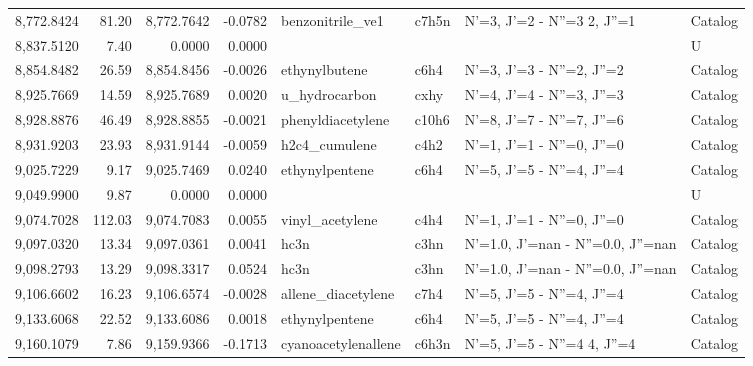 \begin{longtable}{rrrrllll}
 8,772.8424 &     81.20 &        8,772.7642 &   -0.0782 &            benzonitrile_ve1 &   c7h5n &      N'=3, J'=2 - N''=3     2, J''=1 &    Catalog \\
 8,837.5120 &      7.40 &            0.0000 &    0.0000 &                             &         &                                      &          U \\
 8,854.8482 &     26.59 &        8,854.8456 &   -0.0026 &               ethynylbutene &    c6h4 &            N'=3, J'=3 - N''=2, J''=2 &    Catalog \\
 8,925.7669 &     14.59 &        8,925.7689 &    0.0020 &               u_hydrocarbon &    cxhy &            N'=4, J'=4 - N''=3, J''=3 &    Catalog \\
 8,928.8876 &     46.49 &        8,928.8855 &   -0.0021 &           phenyldiacetylene &   c10h6 &            N'=8, J'=7 - N''=7, J''=6 &    Catalog \\
 8,931.9203 &     23.93 &        8,931.9144 &   -0.0059 &               h2c4_cumulene &    c4h2 &            N'=1, J'=1 - N''=0, J''=0 &    Catalog \\
 9,025.7229 &      9.17 &        9,025.7469 &    0.0240 &              ethynylpentene &    c6h4 &            N'=5, J'=5 - N''=4, J''=4 &    Catalog \\
 9,049.9900 &      9.87 &            0.0000 &    0.0000 &                             &         &                                      &          U \\
 9,074.7028 &    112.03 &        9,074.7083 &    0.0055 &             vinyl_acetylene &    c4h4 &            N'=1, J'=1 - N''=0, J''=0 &    Catalog \\
 9,097.0320 &     13.34 &        9,097.0361 &    0.0041 &                        hc3n &    c3hn &    N'=1.0, J'=nan - N''=0.0, J''=nan &    Catalog \\
 9,098.2793 &     13.29 &        9,098.3317 &    0.0524 &                        hc3n &    c3hn &    N'=1.0, J'=nan - N''=0.0, J''=nan &    Catalog \\
 9,106.6602 &     16.23 &        9,106.6574 &   -0.0028 &          allene_diacetylene &    c7h4 &            N'=5, J'=5 - N''=4, J''=4 &    Catalog \\
 9,133.6068 &     22.52 &        9,133.6086 &    0.0018 &              ethynylpentene &    c6h4 &            N'=5, J'=5 - N''=4, J''=4 &    Catalog \\
 9,160.1079 &      7.86 &        9,159.9366 &   -0.1713 &         cyanoacetylenallene &   c6h3n &      N'=5, J'=5 - N''=4     4, J''=4 &    Catalog \\

\end{longtable}
